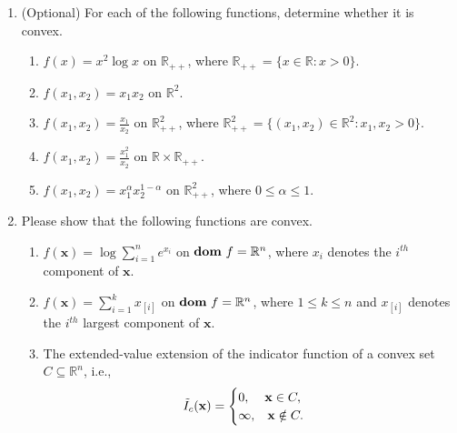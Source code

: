 \documentclass[11pt,letter,notitlepage]{article}
\DeclareMathOperator*{\dom}{\bf dom\,}
\begin{document}
\begin{exercise}
    \begin{enumerate}
        \item (Optional)
        For each of the following functions, determine whether it is convex. %
        \begin{enumerate}
            \item
            $f(x)=x^2\log x$ on $\mathbb{R}_{++}$, where $\mathbb{R}_{++}=\{x\in\mathbb{R}:x>0\}$.
            \item
            $f(x_1,x_2)=x_1x_2$ on $\mathbb{R}^2$.
            \item
            $f(x_1,x_2)=\frac{x_1}{x_2}$ on $\mathbb{R}^2_{++}$, where $\mathbb{R}^2_{++}=\{ (x_1,x_2)\in\mathbb{R}^2:x_1,x_2>0\}$.
            \item
            $f(x_1,x_2)=\frac{x_1^2}{x_2}$ on $\mathbb{R}\times\mathbb{R}_{++}$.
            \item
            $f(x_1,x_2)=x_1^\alpha x_2^{1-\alpha}$ on $\mathbb{R}^2_{++}$, where $0\le\alpha\le 1$.
        \end{enumerate}
        \item
        Please show that the following functions are convex.
        \begin{enumerate}
            \item
            $ f(\mathbf{x})=\log \sum_{i=1}^n e^{x_i}$ 
            on $\dom f=\mathbb{R}^n$, where $x_i$ denotes the $i^{th}$ component of $\mathbf{x}$.
            
            \item
            $f(\mathbf{x})=\sum_{i=1}^k x_{[i]}$ on $\dom f=\mathbb{R}^n$, where $1\le k\le n$ and $x_{[i]}$ denotes the $i^{th}$ largest component of $\mathbf{x}$.
            
            \item The extended-value extension of the indicator function of a convex set $C\subseteq\mathbb{R}^n$, i.e.,
            \begin{align*}
                \Tilde{I}_c(\mathbf{x})=
                \begin{cases}
                    0,\hspace{4mm}\mathbf{x}\in C,\\
                    \infty,\hspace{3mm}\mathbf{x}\notin C.
                \end{cases}
            \end{align*}
            

\end{enumerate}
\end{enumerate}
\end{exercise}
\end{document}
